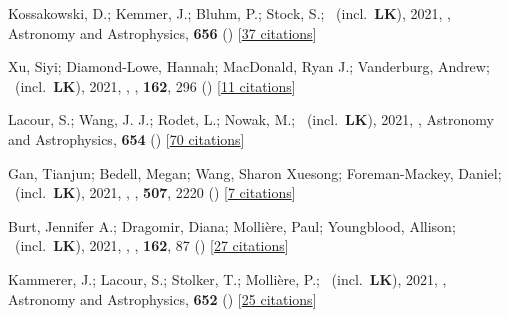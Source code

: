 \item[{\color{numcolor}\scriptsize61}] Kossakowski, D.; Kemmer, J.; Bluhm, P.; Stock, S.; \etal\ (incl.\ \textbf{LK}), 2021, , Astronomy and Astrophysics, \textbf{656} () [\href{https://ui.adsabs.harvard.edu/abs/2021A&A...656A.124K}{37 citations}]

\item[{\color{numcolor}\scriptsize60}] Xu, Siyi; Diamond-Lowe, Hannah; MacDonald, Ryan J.; Vanderburg, Andrew; \etal\ (incl.\ \textbf{LK}), 2021, , \aj, \textbf{162}, 296 () [\href{https://ui.adsabs.harvard.edu/abs/2021AJ....162..296X}{11 citations}]

\item[{\color{numcolor}\scriptsize59}] Lacour, S.; Wang, J. J.; Rodet, L.; Nowak, M.; \etal\ (incl.\ \textbf{LK}), 2021, , Astronomy and Astrophysics, \textbf{654} () [\href{https://ui.adsabs.harvard.edu/abs/2021A&A...654L...2L}{70 citations}]

\item[{\color{numcolor}\scriptsize58}] Gan, Tianjun; Bedell, Megan; Wang, Sharon Xuesong; Foreman-Mackey, Daniel; \etal\ (incl.\ \textbf{LK}), 2021, , \mnras, \textbf{507}, 2220 () [\href{https://ui.adsabs.harvard.edu/abs/2021MNRAS.507.2220G}{7 citations}]

\item[{\color{numcolor}\scriptsize57}] Burt, Jennifer A.; Dragomir, Diana; Molli{\`e}re, Paul; Youngblood, Allison; \etal\ (incl.\ \textbf{LK}), 2021, , \aj, \textbf{162}, 87 () [\href{https://ui.adsabs.harvard.edu/abs/2021AJ....162...87B}{27 citations}]

\item[{\color{numcolor}\scriptsize56}] Kammerer, J.; Lacour, S.; Stolker, T.; Molli{\`e}re, P.; \etal\ (incl.\ \textbf{LK}), 2021, , Astronomy and Astrophysics, \textbf{652} () [\href{https://ui.adsabs.harvard.edu/abs/2021A&A...652A..57K}{25 citations}]


